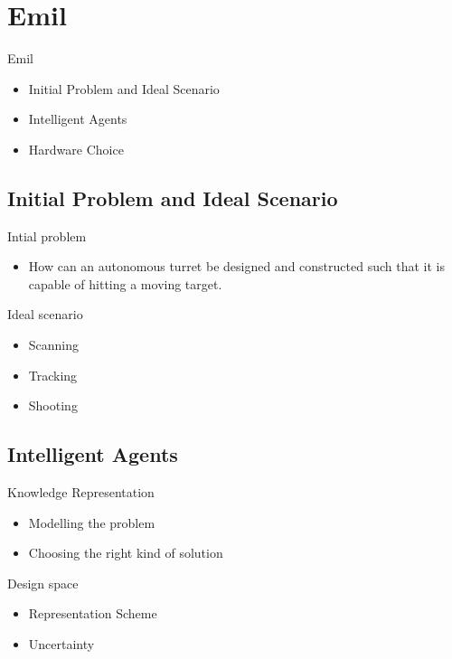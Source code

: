 \section{Emil}
\begin{frame}{Emil}
\begin{itemize}
  \item Initial Problem and Ideal Scenario
  \item Intelligent Agents
  \item Hardware Choice
\end{itemize}
\end{frame}

\subsection{Initial Problem and Ideal Scenario}
\begin{frame}{Intial problem}
\begin{itemize}
\item How can an autonomous turret be designed and constructed such
that it is capable of hitting a moving target.
\end{itemize}
\end{frame}

\begin{frame}{Ideal scenario}
\begin{itemize}
  \item Scanning
  \item Tracking
  \item Shooting
\end{itemize}
\end{frame}

\subsection{Intelligent Agents}
\begin{frame}{Knowledge Representation}
\begin{itemize}
  \item Modelling the problem
  \item Choosing the right kind of solution
\end{itemize}
\end{frame}

\begin{frame}{Design space}
\begin{itemize}
\item Representation Scheme
\item Uncertainty
\end{itemize}
\end{frame}

